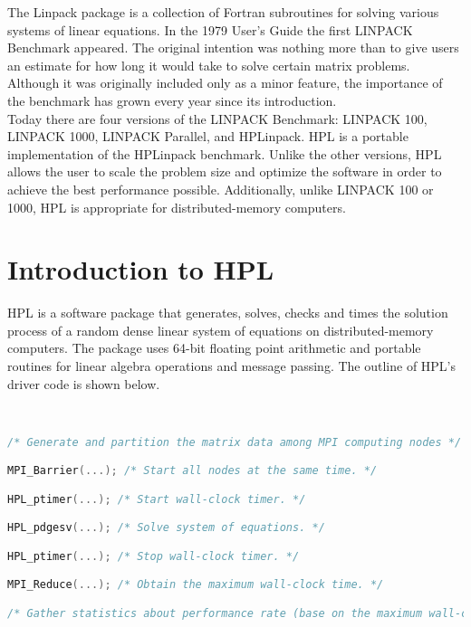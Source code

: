 \documentclass[a4paper, 11pt]{article}
\begin{document}
The Linpack package is a collection of Fortran subroutines for solving various systems of linear equations. In the 1979 User's Guide the first LINPACK Benchmark appeared. The original intention was nothing more than to give users an estimate for how long it would take to solve certain matrix problems. Although it was originally included only as a minor feature, the importance of the benchmark has grown every year since its introduction.\cite{website:faq}\\

Today there are four versions of the LINPACK Benchmark: LINPACK 100, LINPACK 1000, LINPACK Parallel, and HPLinpack. HPL is a portable implementation of the HPLinpack benchmark. Unlike the other versions, HPL allows the user to scale the problem size and optimize the software in order to achieve the best performance possible. Additionally, unlike LINPACK 100 or 1000, HPL is appropriate for distributed-memory computers.

\section{Introduction to HPL}

HPL is a software package that generates, solves, checks and times the solution process of a random dense linear system of equations on distributed-memory computers. The package uses 64-bit floating point arithmetic and portable routines for linear algebra operations and message passing. The outline of HPL's driver code is shown below.\cite{website:paper}

\

\begin{lstlisting}[language=C]
/* Generate and partition the matrix data among MPI computing nodes */

MPI_Barrier(...); /* Start all nodes at the same time. */

HPL_ptimer(...); /* Start wall-clock timer. */

HPL_pdgesv(...); /* Solve system of equations. */

HPL_ptimer(...); /* Stop wall-clock timer. */

MPI_Reduce(...); /* Obtain the maximum wall-clock time. */

/* Gather statistics about performance rate (base on the maximum wall-clock time) and accuracy of the solution. */
\end{lstlisting}

\
\end{document}
